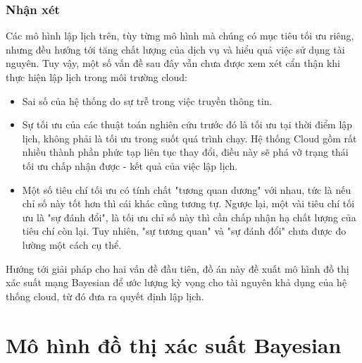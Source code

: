 \documentclass{my_style}
\begin{document}
\subsection*{Nhận xét}
Các mô hình lập lịch trên, tùy từng mô hình mà chúng có mục tiêu tối ưu riêng, nhưng đều hướng tới tăng chất lượng của dịch vụ và hiểu quả việc sử dụng tài nguyên. Tuy vậy, một số vấn đề sau đây vẫn chưa được xem xét cẩn thận khi thực hiện lập lịch trong môi trường cloud: 
\begin{itemize}
	\item Sai số của hệ thống do sự trễ trong việc truyền thông tin.
	\item Sự tối ưu của các thuật toán nghiên cứu trước đó là tối ưu tại thời điểm lập lịch, không phải là tối ưu trong suốt quá trình chạy. Hệ thống Cloud gồm rất nhiều thành phần phức tạp liên tục thay đổi, điều này sẽ phá vỡ trạng thái tối ưu chấp nhận được - kết quả của việc lập lịch. 
	\item Một số tiêu chí tối ưu có tính chất "tương quan dương" với nhau, tức là nếu chỉ số này tốt hơn thì cái khác cũng tương tự. Ngược lại, một vài tiêu chí tối ưu là "sự đánh đổi", là tối ưu chỉ số này thì cần chấp nhận hạ chất lượng của tiêu chí còn lại. Tuy nhiên, "sự tương quan" và "sự đánh đổi" chưa được đo lường một cách cụ thể. 
\end{itemize}
Hướng tới giải pháp cho hai vấn đề đầu tiên, đồ án này đề xuất mô hình đồ thị xác suất mạng Bayesian để ước lượng kỳ vọng cho tài nguyên khả dụng của hệ thống cloud, từ đó đưa ra quyết định lập lịch. 


\newpage
\chapter{Mô hình đồ thị xác suất Bayesian}
\label{Bayesian_network}
\end{document}

